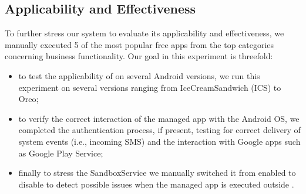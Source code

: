 \subsection{Applicability and Effectiveness}
To further stress our system to evaluate its applicability and effectiveness, we manually executed 5 of the most popular free apps from the top categories concerning business functionality. Our goal in this experiment is threefold: 
\begin{itemize}
\item to test the applicability of \asd on several Android versions, we run this experiment on several versions ranging from IceCreamSandwich (ICS) to Oreo;
\item to verify the correct interaction of the managed app with the Android OS, we  completed the authentication process, if present, testing for correct delivery of system events (i.e., incoming SMS) and the interaction with Google apps such as Google Play Service;
\item finally to stress the \asd SandboxService we manually switched it from enabled to disable to detect possible issues when the managed app is executed outside \asd.
\end{itemize}

